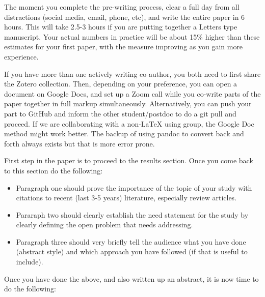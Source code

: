 \documentclass[12 pt]{article}
\begin{document}
The moment you complete the pre-writing process, clear a full day from all distractions (social media, email, phone, etc), and write the entire paper in 6 hours. This will take 2.5-3 hours if you are putting together a Letters type manuscript. Your actual numbers in practice will be about 15\% higher than these estimates for your first paper, with the measure improving as you gain more experience.

If you have more than one actively writing co-author, you both need to first share the Zotero collection. Then, depending on your preference, you can open a document on Google Docs, and set up a Zoom call while you co-write parts of the paper together in full markup simultaneously. Alternatively, you can push your part to GitHub and inform the other student/postdoc to do a git pull and proceed. If we are collaborating with a non-LaTeX using group, the Google Doc method might work better. The backup of using pandoc to convert back and forth always exists but that is more error prone.

First step in the paper is to proceed to the results section. Once you come back to this section do the following:

\begin{itemize}
\item Paragraph one should prove the importance of the topic of your study with citations to recent (last 3-5 years) literature, especially review articles.
\item Pararaph two should clearly establish the need statement for the study by clearly defining the open problem that needs addressing.
\item Paragraph three should very briefly tell the audience what you have done (abstract style) and which approach you have followed (if that is useful to include).
\end{itemize}

Once you have done the above, and also written up an abstract, it is now time to do the following:
\end{document}
